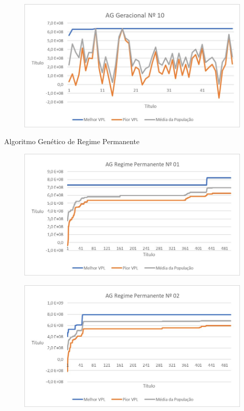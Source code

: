 \documentclass[12pt,a4paper]{report}
\begin{document}
\begin{figure}[H]
\centering

\includegraphics[scale=1]{AGG/10}

\end{figure}

Algoritmo Genético de Regime Permanente

\begin{figure}[H]
\centering

\includegraphics[scale=1]{AGRP/1}

\end{figure}

\begin{figure}[H]
\centering

\includegraphics[scale=1]{AGRP/2}

\end{figure}
\end{document}
